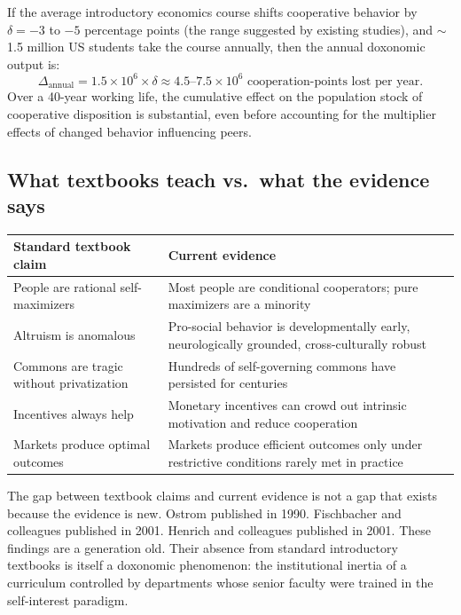 \begin{proposition}
\label{prop:econ-education}
If the average introductory economics course shifts cooperative behavior by $\delta = -3$ to $-5$ percentage points (the range suggested by existing studies), and $\sim$1.5 million US students take the course annually, then the annual doxonomic output is:
\[
  \Delta_{\text{annual}} = 1.5 \times 10^6 \times \delta \approx 4.5\text{--}7.5 \times 10^6 \text{ cooperation-points lost per year.}
\]
Over a 40-year working life, the cumulative effect on the population stock of cooperative disposition is substantial, even before accounting for the multiplier effects of changed behavior influencing peers.
\end{proposition}

\subsection{What textbooks teach vs.\ what the evidence says}

\begin{center}
\begin{tabular}{p{5.5cm}p{5.5cm}}
\toprule
Standard textbook claim & Current evidence \\
\midrule
People are rational self-maximizers & Most people are conditional cooperators; pure maximizers are a minority \\[4pt]
Altruism is anomalous & Pro-social behavior is developmentally early, neurologically grounded, cross-culturally robust \\[4pt]
Commons are tragic without privatization & Hundreds of self-governing commons have persisted for centuries \\[4pt]
Incentives always help & Monetary incentives can crowd out intrinsic motivation and reduce cooperation \\[4pt]
Markets produce optimal outcomes & Markets produce efficient outcomes only under restrictive conditions rarely met in practice \\
\bottomrule
\end{tabular}
\end{center}

The gap between textbook claims and current evidence is not a gap that exists because the evidence is new.
Ostrom published in 1990.
Fischbacher and colleagues published in 2001.
Henrich and colleagues published in 2001.
These findings are a generation old.
Their absence from standard introductory textbooks is itself a doxonomic phenomenon: the institutional inertia of a curriculum controlled by departments whose senior faculty were trained in the self-interest paradigm.


